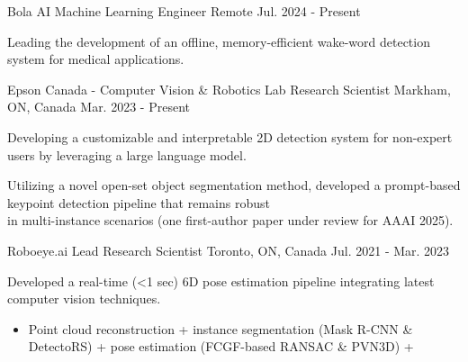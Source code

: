 

\vspace*{0.05cm}
\begin{cventries}

\cventry
{Bola AI} %
{Machine Learning Engineer} %
{Remote} %
{Jul. 2024 - Present} %
{ %
\begin{cvitems}
\item {Leading the development of an offline, memory-efficient wake-word detection system for medical applications.}
\end{cvitems}
}
\cventry
{Epson Canada - Computer Vision \& Robotics Lab} %
{Research Scientist} %
{Markham, ON, Canada} %
{Mar. 2023 - Present} %
{ %
\begin{cvitems}
\item {Developing a customizable and interpretable 2D detection system for non-expert users by leveraging a large language model.}
\item {Utilizing a novel open-set object segmentation method, developed a prompt-based keypoint detection pipeline that remains robust \\
in multi-instance scenarios (one first-author paper under review for AAAI 2025).}
\end{cvitems}
}
\cventry
{Roboeye.ai} %
{Lead Research Scientist} %
{Toronto, ON, Canada} %
{Jul. 2021 - Mar. 2023} %
{ %
\begin{cvitems}
\item {Developed a real-time (<1 sec) 6D pose estimation pipeline integrating latest computer vision techniques.}
\begin{itemize}[label=$\cdot$,leftmargin=0.7em]
\item{Point cloud reconstruction + instance segmentation (Mask R-CNN \& DetectoRS) + pose estimation (FCGF-based RANSAC \& PVN3D) + \\
}
\end{itemize}
\end{cvitems}}
\end{cventries}
